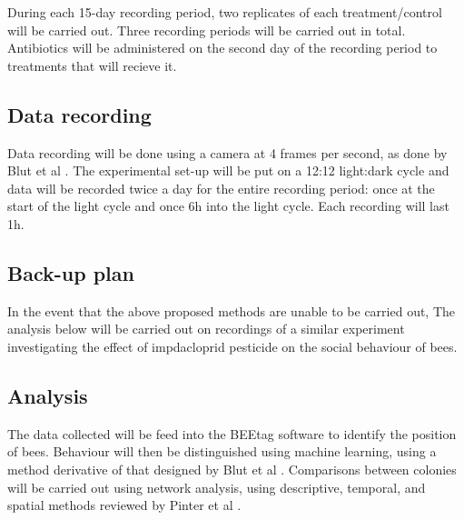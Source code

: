 \documentclass[10pt]{article}
\begin{document}
            During each 15-day recording period,
            two replicates of each treatment/control will be carried out.
            Three recording periods will be carried out in total.
            Antibiotics will be administered on the second day of the recording period to treatments that will recieve it.
 
       \subsection{Data recording}
            Data recording will be done using a camera at 4 frames per second, 
            as done by Blut et al
            \cite{blut2017automated}.
            The experimental set-up will be put on a 12:12 light:dark cycle and data will be recorded twice a day for the entire recording period:
            once at the start of the light cycle and once 6h into the light cycle. Each recording will last 1h.
 
        \subsection{Back-up plan}
        In the event that the above proposed methods are unable to be carried out,
        The analysis below will be carried out on recordings of a similar experiment investigating the effect of impdacloprid pesticide on the social behaviour of bees.
 
        \subsection{Analysis}
            The data collected will be feed into the BEEtag software
            \cite{crall2015beetag} to identify the position of bees.
            Behaviour will then be distinguished using machine learning, using a method derivative of that designed by Blut et al
           \cite{blut2017automated}.
            Comparisons between colonies will be carried out using network analysis, using descriptive, temporal, and spatial methods reviewed by Pinter et al
            \cite{pinter2014dynamics}.
        
\end{document}
